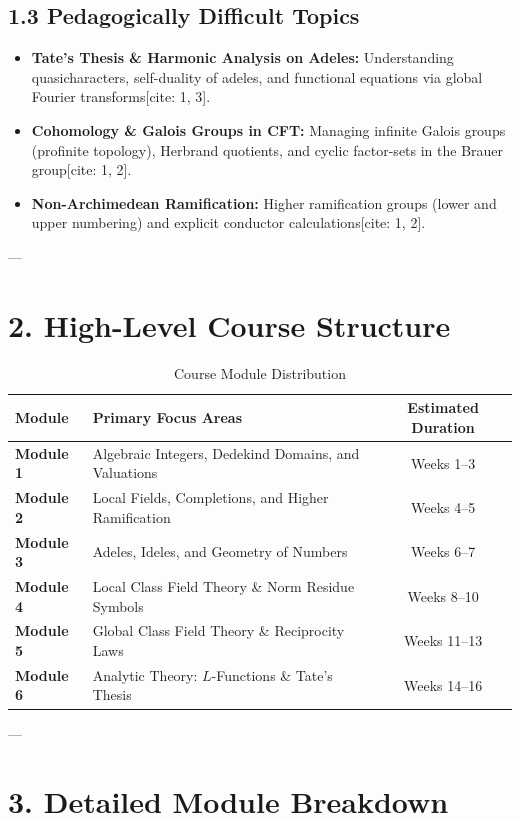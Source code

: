 \documentclass[11pt,a4paper]{article}
\begin{document}
\subsection*{1.3 Pedagogically Difficult Topics}
\begin{itemize}[leftmargin=*]
    \item \textbf{Tate's Thesis \& Harmonic Analysis on Adeles:} Understanding quasicharacters, self-duality of adeles, and functional equations via global Fourier transforms[cite: 1, 3].
    \item \textbf{Cohomology \& Galois Groups in CFT:} Managing infinite Galois groups (profinite topology), Herbrand quotients, and cyclic factor-sets in the Brauer group[cite: 1, 2].
    \item \textbf{Non-Archimedean Ramification:} Higher ramification groups (lower and upper numbering) and explicit conductor calculations[cite: 1, 2].
\end{itemize}

---

\section*{2. High-Level Course Structure}

\begin{table}[h!]
\centering
\small
\begin{tabular}{@{}>{\bfseries}l p{10cm} c@{}}
\toprule
Module & Primary Focus Areas & Estimated Duration \\
\midrule
Module 1 & Algebraic Integers, Dedekind Domains, and Valuations & Weeks 1--3 \\
Module 2 & Local Fields, Completions, and Higher Ramification & Weeks 4--5 \\
Module 3 & Adeles, Ideles, and Geometry of Numbers & Weeks 6--7 \\
Module 4 & Local Class Field Theory \& Norm Residue Symbols & Weeks 8--10 \\
Module 5 & Global Class Field Theory \& Reciprocity Laws & Weeks 11--13 \\
Module 6 & Analytic Theory: $L$-Functions \& Tate's Thesis & Weeks 14--16 \\
\bottomrule
\end{tabular}
\caption{Course Module Distribution}
\end{table}

---

\section*{3. Detailed Module Breakdown}
\end{document}
